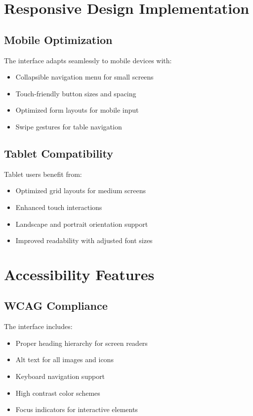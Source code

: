 \section{Responsive Design Implementation}

\subsection{Mobile Optimization}
The interface adapts seamlessly to mobile devices with:
\begin{itemize}
    \item Collapsible navigation menu for small screens
    \item Touch-friendly button sizes and spacing
    \item Optimized form layouts for mobile input
    \item Swipe gestures for table navigation
\end{itemize}

\subsection{Tablet Compatibility}
Tablet users benefit from:
\begin{itemize}
    \item Optimized grid layouts for medium screens
    \item Enhanced touch interactions
    \item Landscape and portrait orientation support
    \item Improved readability with adjusted font sizes
\end{itemize}

\section{Accessibility Features}

\subsection{WCAG Compliance}
The interface includes:
\begin{itemize}
    \item Proper heading hierarchy for screen readers
    \item Alt text for all images and icons
    \item Keyboard navigation support
    \item High contrast color schemes
    \item Focus indicators for interactive elements
\end{itemize}

